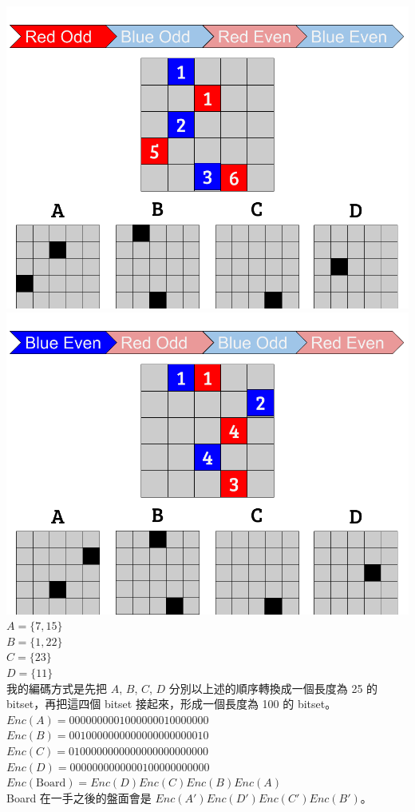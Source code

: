 \documentclass[12pt,a4paper]{article}
\begin{document}
        \includegraphics[scale=0.25]{img/Board1}\includegraphics[scale=0.25]{img/Board2}\\
        \(A = \{7, 15\}\)\\
        \(B = \{1, 22\}\)\\
        \(C = \{23\}\)\\
        \(D = \{11\}\)\\
        我的編碼方式是先把 \(A\), \(B\), \(C\), \(D\) 分別以上述的順序轉換成一個長度為 25 的 bitset，再把這四個 bitset 接起來，形成一個長度為 100 的 bitset。\\
        \(Enc(A) = 0000000001000000010000000\)\\
        \(Enc(B) = 0010000000000000000000010\)\\
        \(Enc(C) = 0100000000000000000000000\)\\
        \(Enc(D) = 0000000000000100000000000\)\\
        \(Enc(\text{Board})=Enc(D)Enc(C)Enc(B)Enc(A)\)\\
        Board 在一手之後的盤面會是 \(Enc(A')Enc(D')Enc(C')Enc(B')\)。
\end{document}
